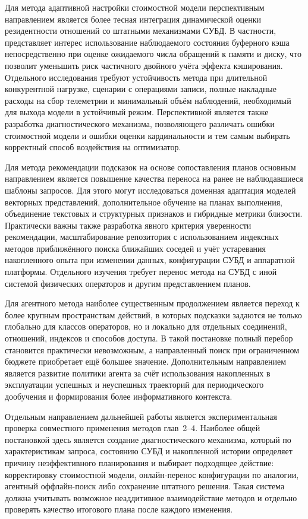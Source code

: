 Для метода адаптивной настройки стоимостной модели перспективным направлением является более тесная интеграция динамической оценки резидентности отношений со штатными механизмами СУБД. В частности, представляет интерес использование наблюдаемого состояния буферного кэша непосредственно при оценке ожидаемого числа обращений к памяти и диску, что позволит уменьшить риск частичного двойного учёта эффекта кэширования. Отдельного исследования требуют устойчивость метода при длительной конкурентной нагрузке, сценарии с операциями записи, полные накладные расходы на сбор телеметрии и минимальный объём наблюдений, необходимый для выхода модели в устойчивый режим. Перспективной является также разработка диагностического механизма, позволяющего различать ошибки стоимостной модели и ошибки оценки кардинальности и тем самым выбирать корректный способ воздействия на оптимизатор.

Для метода рекомендации подсказок на основе сопоставления планов основным направлением является повышение качества переноса на ранее не наблюдавшиеся шаблоны запросов. Для этого могут исследоваться доменная адаптация моделей векторных представлений, дополнительное обучение на планах выполнения, объединение текстовых и структурных признаков и гибридные метрики близости. Практически важны также разработка явного критерия уверенности рекомендации, масштабирование репозитория с использованием индексных методов приближённого поиска ближайших соседей и учёт устаревания накопленного опыта при изменении данных, конфигурации СУБД и аппаратной платформы. Отдельного изучения требует перенос метода на СУБД с иной системой физических операторов и другим представлением планов.

Для агентного метода наиболее существенным продолжением является переход к более крупным пространствам действий, в которых подсказки задаются не только глобально для классов операторов, но и локально для отдельных соединений, отношений, индексов и способов доступа. В такой постановке полный перебор становится практически невозможным, а направленный поиск при ограниченном бюджете приобретает ещё большее значение. Дополнительным направлением является развитие политики агента за счёт использования накопленных в эксплуатации успешных и неуспешных траекторий для периодического дообучения и формирования более информативного контекста.

Отдельным направлением дальнейшей работы является экспериментальная проверка совместного применения методов глав~2--4. Наиболее общей постановкой здесь является создание диагностического механизма, который по характеристикам запроса, состоянию СУБД и накопленной истории определяет причину неэффективного планирования и выбирает подходящее действие: корректировку стоимостной модели, онлайн-перенос конфигурации по аналогии, агентный оффлайн-поиск либо сохранение штатного решения. Такая система должна учитывать возможное неаддитивное взаимодействие методов и отдельно проверять качество итогового плана после каждого изменения.

